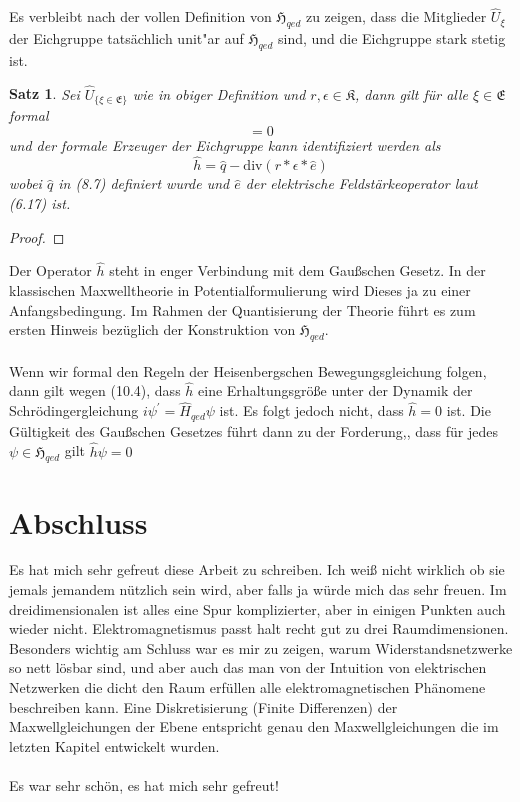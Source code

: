 \documentclass[11pt,a4paper,leqno]{report}
\newtheorem{proposition}{Satz}[chapter]
\numberwithin{equation}{chapter}
\begin{document}
\noindent
Es verbleibt nach der vollen Definition von $\mathfrak{H}_{qed}$ zu zeigen, dass die Mitglieder $\hat{U}_\xi$ der Eichgruppe tats\"achlich unit"ar auf $\mathfrak{H}_{qed}$ sind, und die Eichgruppe stark stetig ist.
\begin{proposition}
	Sei $\hat{U}_{\{\xi\in \mathfrak{E}\}}$ wie in obiger Definition und $r,\epsilon\in\mathfrak{K}$, dann gilt f\"ur alle $\xi\in \mathfrak{E}$ formal
	\begin{equation}
		[\hat{H}_{qed}, \hat{U}_\xi]=0
	\end{equation}
	und der formale Erzeuger der Eichgruppe kann identifiziert werden als
	\begin{equation}
		\hat{h} = \hat{q} - \text{div}(r*\epsilon*\hat{e})
	\end{equation}
	wobei $\hat{q}$ in (8.7) definiert wurde und $\hat{e}$ der elektrische Feldst\"arkeoperator laut (6.17) ist.
\end{proposition}
\begin{proof}
\end{proof}
\noindent
Der Operator $\hat{h}$ steht in enger Verbindung mit dem Gau\ss{}schen Gesetz. In der klassischen Maxwelltheorie in Potentialformulierung wird Dieses ja zu einer Anfangsbedingung. Im Rahmen der Quantisierung der Theorie f\"uhrt es zum ersten Hinweis bez\"uglich der Konstruktion von $\mathfrak{H}_{qed}$. \\
\\
Wenn wir formal den Regeln der Heisenbergschen Bewegungsgleichung folgen, dann gilt wegen (10.4), dass $\hat{h}$ eine Erhaltungsgr\"o\ss{}e unter der Dynamik der Schr\"odingergleichung $i\psi^\prime=\hat{H}_{qed}\psi$ ist. Es folgt jedoch nicht, dass $\hat{h}=0$ ist. Die G\"ultigkeit des Gau\ss{}schen Gesetzes f\"uhrt dann zu der Forderung,, dass f\"ur jedes $\psi\in\mathfrak{H}_{qed}$ gilt $\hat{h}\psi = 0$
\chapter*{Abschluss}
Es hat mich sehr gefreut diese Arbeit zu schreiben. Ich wei\ss{} nicht wirklich ob sie jemals jemandem n\"utzlich sein wird, aber falls ja w\"urde mich das sehr freuen. Im dreidimensionalen ist alles eine Spur komplizierter, aber in einigen Punkten auch wieder nicht. Elektromagnetismus passt halt recht gut zu drei Raumdimensionen. Besonders wichtig am Schluss war es mir zu zeigen, warum Widerstandsnetzwerke so nett l\"osbar sind, und aber auch das man von der Intuition von elektrischen Netzwerken die dicht den Raum erf\"ullen alle elektromagnetischen Ph\"anomene beschreiben kann. Eine Diskretisierung (Finite Differenzen) der Maxwellgleichungen der Ebene entspricht genau den Maxwellgleichungen die im letzten Kapitel entwickelt wurden. \\
\\
Es war sehr sch\"on, es hat mich sehr gefreut!
\end{document}
